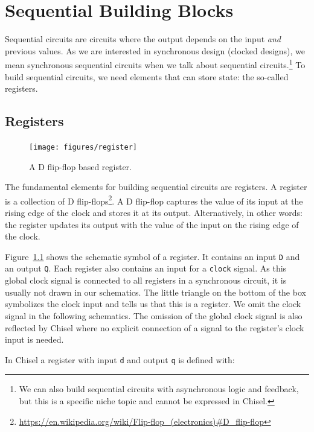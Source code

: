 \documentclass[%
    10pt,
    headinclude, footexclude,
    openright, %
    notitlepage,
    cleardoubleempty,
    headsepline,
    pointlessnumbers,
    bibtotoc, idxtotoc,
    ]{scrbook}
\newcommand{\code}[1]{{\small{\texttt{#1}}}}
\newcommand{\myref}[2]{\href{#1}{#2}}
\renewcommand{\myref}[2]{{#2}{\footnote{\url{#1}}}}
\begin{document}
\chapter{Sequential Building Blocks}

Sequential circuits are circuits where the output depends on the input \emph{and}
previous values. As we are interested in synchronous design (clocked designs),
we mean synchronous sequential circuits when we talk about sequential
circuits.\footnote{We can also build sequential circuits with asynchronous logic and
feedback, but this is a specific niche topic and cannot be expressed in Chisel.}
To build sequential circuits, we need elements that can store state:
the so-called registers.

\section{Registers}


\begin{figure}
  \centering
  \texttt{[image: figures/register]}
  \caption{A D flip-flop based register.}
  \label{fig:register}
\end{figure}

The fundamental elements for building sequential circuits are registers. A register is a collection
of \myref{https://en.wikipedia.org/wiki/Flip-flop_(electronics)\#D_flip-flop}{D flip-flops}.
A D flip-flop captures the value of its input at the rising edge of the clock and stores
it at its output. Alternatively, in other words: the register updates its output with the value of the input on the rising edge of the clock.

Figure~\ref{fig:register} shows the schematic symbol of a register. It contains an input
\code{D} and an output \code{Q}. Each register also contains an input for a \code{clock} signal.
As this global clock signal is connected to all registers in a synchronous circuit, it is usually
not drawn in our schematics. The little triangle on the bottom of the box symbolizes the
clock input and tells us that this is a register. We omit the clock signal in the following
schematics.
The omission of the global clock signal is also reflected by Chisel where no explicit
connection of a signal to the register's clock input is needed.

In Chisel a register with input \code{d} and output \code{q} is defined with:

\end{document}
